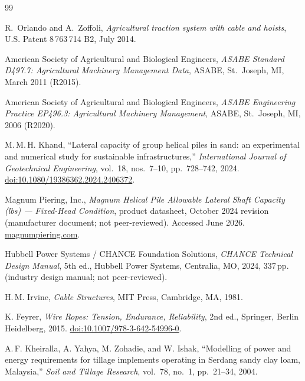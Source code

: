 \documentclass[11pt,a4paper]{article}
\begin{document}
\begin{thebibliography}{99}\setlength{\itemsep}{0.18em}

R.~Orlando and A.~Zoffoli,
\emph{Agricultural traction system with cable and hoists},
U.S. Patent 8\,763\,714 B2, July 2014.

American Society of Agricultural and Biological Engineers,
\emph{ASABE Standard D497.7: Agricultural Machinery Management Data},
ASABE, St.\ Joseph, MI, March 2011 (R2015).

American Society of Agricultural and Biological Engineers,
\emph{ASABE Engineering Practice EP496.3: Agricultural Machinery Management},
ASABE, St.\ Joseph, MI, 2006 (R2020).

M.\,M.\,H. Khand,
``Lateral capacity of group helical piles in sand: an experimental and numerical study for sustainable infrastructures,''
\emph{International Journal of Geotechnical Engineering}, vol.~18, nos.~7--10, pp.~728--742, 2024.
\href{https://doi.org/10.1080/19386362.2024.2406372}{doi:10.1080/19386362.2024.2406372}.

Magnum Piering, Inc.,
\emph{Magnum Helical Pile Allowable Lateral Shaft Capacity (lbs) --- Fixed-Head Condition},
product datasheet, October 2024 revision (manufacturer document; not peer-reviewed). Accessed June 2026.
\href{https://magnumpiering.com/wp-content/uploads/2024/10/Lateral\%20Shaft\%20Capacity\%20Fixed.pdf}{magnumpiering.com}.

Hubbell Power Systems / CHANCE Foundation Solutions,
\emph{CHANCE Technical Design Manual}, 5th ed.,
Hubbell Power Systems, Centralia, MO, 2024, 337\,pp. (industry design manual; not peer-reviewed).

H.\,M. Irvine,
\emph{Cable Structures},
MIT Press, Cambridge, MA, 1981.

K. Feyrer,
\emph{Wire Ropes: Tension, Endurance, Reliability}, 2nd ed.,
Springer, Berlin Heidelberg, 2015.
\href{https://doi.org/10.1007/978-3-642-54996-0}{doi:10.1007/978-3-642-54996-0}.

A.\,F. Kheiralla, A. Yahya, M. Zohadie, and W. Ishak,
``Modelling of power and energy requirements for tillage implements operating in Serdang sandy clay loam, Malaysia,''
\emph{Soil and Tillage Research}, vol.~78, no.~1, pp.~21--34, 2004.


\end{thebibliography}
\end{document}

